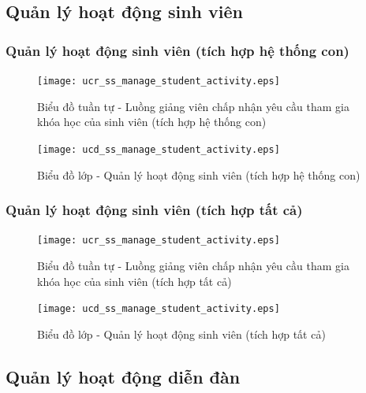 \documentclass[./../main.tex]{subfiles}
\begin{document}
\subsection{Quản lý hoạt động sinh viên}
\subsubsection{Quản lý hoạt động sinh viên (tích hợp hệ thống con)}
\begin{figure}[H]
    \centering
    \texttt{[image: ucr\_ss\_manage\_student\_activity.eps]}
    \caption{Biểu đồ tuần tự - Luồng giảng viên chấp nhận yêu cầu tham gia khóa học của sinh viên (tích hợp hệ thống con)}
\end{figure}
\begin{figure}[H]
    \centering
    \texttt{[image: ucd\_ss\_manage\_student\_activity.eps]}
    \caption{Biểu đồ lớp - Quản lý hoạt động sinh viên (tích hợp hệ thống con)}
\end{figure}
\subsubsection{Quản lý hoạt động sinh viên (tích hợp tất cả)}
\begin{figure}[H]
    \centering
    \texttt{[image: ucr\_ss\_manage\_student\_activity.eps]}
    \caption{Biểu đồ tuần tự - Luồng giảng viên chấp nhận yêu cầu tham gia khóa học của sinh viên (tích hợp tất cả)}
\end{figure}
\begin{figure}[H]
    \centering
    \texttt{[image: ucd\_ss\_manage\_student\_activity.eps]}
    \caption{Biểu đồ lớp - Quản lý hoạt động sinh viên (tích hợp tất cả)}
\end{figure}

\subsection{Quản lý hoạt động diễn đàn}
\end{document}
